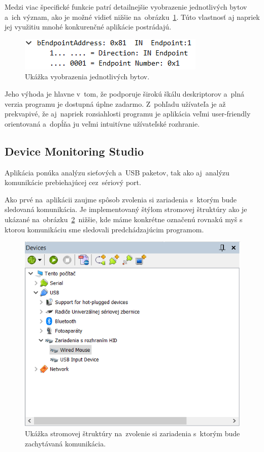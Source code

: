 Medzi viac špecifické funkcie patrí detailnejšie vyobrazenie jednotlivých bytov a~ich význam, ako je možné vidieť nižšie na~obrázku~\ref{obr:uvod:byte_detail_foto}. Túto vlastnosť aj napriek jej využitiu mnohé konkurenčné aplikácie postrádajú.

\begin{figure}[!htb]
	\centering
	\includegraphics[width=\textwidth]{img/uvod_byte_detail}
	\caption{Ukážka vyobrazenia jednotlivých bytov.}
	\label{obr:uvod:byte_detail_foto}
\end{figure}

Jeho výhoda je hlavne v~tom, že podporuje širokú škálu deskriptorov a~plná verzia programu je dostupná úplne zadarmo. Z~pohľadu užívateľa je až prekvapivé, že aj~napriek rozsiahlosti programu je aplikácia veľmi user-friendly orientovaná a~dopĺňa ju veľmi intuitívne užívateľské rozhranie.

\subsection*{Device Monitoring Studio}

Aplikácia ponúka analýzu sieťových a~USB paketov, tak ako aj~analýzu komunikácie prebiehajúcej cez~sériový port.

Ako prvé na~aplikácii zaujme spôsob zvolenia si zariadenia s~ktorým bude sledovaná komunikácia. Je implementovaný štýlom stromovej štruktúry ako je ukázané na~obrázku~\ref{obr:uvod:treeview_foto}~nižšie, kde máme konkrétne označenú rovnakú myš s ktorou komunikáciu sme sledovali predchádzajúcim programom. 

\begin{figure}[!htb]
	\centering
	\includegraphics[width=\textwidth]{img/uvod_treeview}
	\caption{Ukážka stromovej štruktúry na~zvolenie si zariadenia s~ktorým bude zachytávaná komunikácia.}
	\label{obr:uvod:treeview_foto}
\end{figure}

